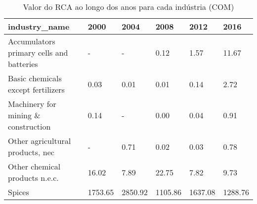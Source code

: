 \begin{table}
\centering
\caption{Valor do RCA ao longo dos anos para cada indústria (COM)}
\begin{tabular}{p{6cm}p{1.5cm}p{1.5cm}p{1.5cm}p{1.5cm}p{1.5cm}}
\toprule
                           industry\_name &    2000 &    2004 &    2008 &    2012 &    2016 \\
\midrule
Accumulators primary cells and batteries &       - &       - &    0.12 &    1.57 &   11.67 \\
      Basic chemicals except fertilizers &    0.03 &    0.01 &    0.01 &    0.14 &    2.72 \\
     Machinery for mining \& construction &    0.14 &       - &    0.00 &    0.04 &    0.91 \\
        Other agricultural products, nec &       - &    0.71 &    0.02 &    0.03 &    0.78 \\
          Other chemical products n.e.c. &   16.02 &    7.89 &   22.75 &    7.82 &    9.73 \\
                                  Spices & 1753.65 & 2850.92 & 1105.86 & 1637.08 & 1288.76 \\
\bottomrule
\end{tabular}
\end{table}
